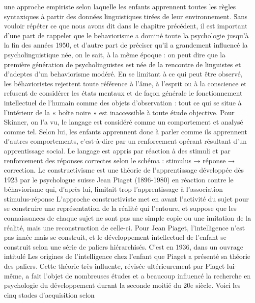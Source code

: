 une approche empiriste selon laquelle les enfants apprennent toutes les règles syntaxiques à partir
des données linguistiques tirées de leur environnement.
Sans vouloir répéter ce que nous avons dit dans le chapitre précédent, il est important d’une part
de rappeler que le behaviorisme a dominé toute la psychologie jusqu'à la fin des années 1950,
et d'autre part de préciser qu'il a grandement influencé la psycholinguistique née, on le sait, à la
même époque : on peut dire que la première génération de psycholinguistes est née de la rencontre
de linguistes et d'adeptes d'un behaviorisme modéré.
En se limitant à ce qui peut être observé, les béhavioristes rejettent toute référence à l’âme, à
l'esprit ou à la conscience et refusent de considérer les états mentaux et de façon générale le
fonctionnement intellectuel de l'humain comme des objets d'observation : tout ce qui se situe à
l'intérieur de la « boîte noire » est inaccessible à toute étude objective.
Pour Skinner, on l'a vu, le langage est considéré comme un comportement et analysé comme tel.
Selon lui, les enfants apprennent donc à parler comme ils apprennent d'autres comportements,
c'est-à-dire par un renforcement opérant résultant d’un apprentissage social. Le langage est appris
par réaction à des stimuli et par renforcement des réponses correctes selon le schéma : stimulus →
réponse → correction.
Le constructivisme est une théorie de l'apprentissage développée dès 1923 par le psychologue
suisse Jean Piaget (1896-1980) en réaction contre le béhaviorisme qui, d'après lui, limitait trop
l'apprentissage à l'association stimulus-réponse L'approche constructiviste met en avant l’activité
du sujet pour se construire une représentation de la réalité qui l'entoure, et suppose que les
connaissances de chaque sujet ne sont pas une simple copie ou une imitation de la réalité, mais une
reconstruction de celle-ci. Pour Jean Piaget, l'intelligence n’est pas innée mais se construit, et le
développement intellectuel de l'enfant se construit selon une série de paliers hiérarchisés.
C'est en 1936, dans un ouvrage intitulé Les origines de l'intelligence chez l'enfant que Piaget a
présenté sa théorie des paliers. Cette théorie très influente, révisée ultérieurement par Piaget lui-
même, a fait l’objet de nombreuses études et a beaucoup influencé la recherche en psychologie
du développement durant la seconde moitié du 20e siècle. Voici les cinq stades d'acquisition selon
